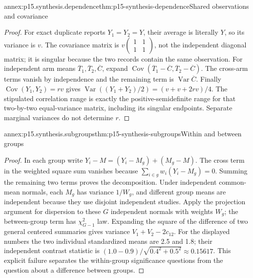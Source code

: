 \begin{annexitem}{annex:p15.synthesis.dependence}{thm:p15-synthesis-dependence}{Shared observations and covariance}
\begin{proof}
For exact duplicate reports \(Y_1=Y_2=Y\), their average is literally
\(Y\), so its variance is \(v\). The covariance matrix is
\(v\left(\begin{smallmatrix}1&1\\1&1\end{smallmatrix}\right)\),
not the independent diagonal matrix; it is singular because the two records
contain the same observation.
For independent arm means \(\overline T_1,\overline T_2,\overline C\),
expand
\(\operatorname{Cov}(\overline T_1-\overline C,
\overline T_2-\overline C)\). The cross-arm terms vanish by independence
and the remaining term is \(\operatorname{Var}\overline C\).
Finally \(\operatorname{Cov}(Y_1,Y_2)=rv\) gives
\(\operatorname{Var}((Y_1+Y_2)/2)=(v+v+2rv)/4\).
The stipulated correlation range is exactly the positive-semidefinite
range for that two-by-two equal-variance matrix, including its singular
endpoints. Separate marginal variances do not determine \(r\).
\end{proof}
\end{annexitem}

\begin{annexitem}{annex:p15.synthesis.subgroups}{thm:p15-synthesis-subgroups}{Within and between groups}
\begin{proof}
In each group write \(Y_i-M=(Y_i-M_g)+(M_g-M)\). The cross term
in the weighted square sum vanishes because
\(\sum_{i\in g}w_i(Y_i-M_g)=0\). Summing the remaining two terms
proves the decomposition.
Under independent common-mean normals, each \(M_g\) has variance
\(1/W_g\), and different group means are independent because they use
disjoint independent studies. Apply the projection argument for dispersion
to these \(G\) independent normals with weights \(W_g\); the
between-group term has \(\chi^2_{G-1}\) law.
Expanding the square of the difference of two general centered summaries
gives variance \(V_1+V_2-2c_{12}\).
For the displayed numbers the two individual standardized means are 2.5
and 1.8; their independent contrast statistic is
\((1.0-0.9)/\sqrt{0.4^2+0.5^2}\approx0.15617\).
This explicit failure separates the within-group significance questions
from the question about a difference between groups.
\end{proof}
\end{annexitem}

